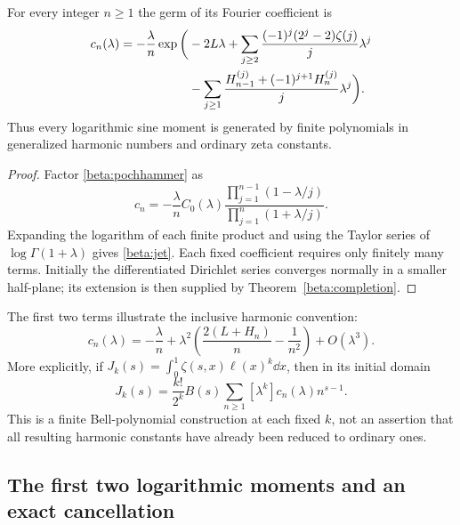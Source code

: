 \begin{proposition}\label{beta:harmonicjets}
For every integer $n\geq1$ the germ of its Fourier coefficient is
\begin{align}\label{beta:jet}
 c_n(\lambda)=-\frac\lambda n\exp\bigg(&-2L\lambda
 +\sum_{j\geq2}\frac{(-1)^j(2^j-2)\zeta(j)}j\lambda^j\notag\\
 &-\sum_{j\geq1}
 \frac{H_{n-1}^{(j)}+(-1)^{j+1}H_n^{(j)}}j\lambda^j\bigg).
\end{align}
Thus every logarithmic sine moment is generated by finite polynomials
in generalized harmonic numbers and ordinary zeta constants.
\end{proposition}
\begin{proof}
Factor \eqref{beta:pochhammer} as
\[
 c_n=-\frac\lambda n C_0(\lambda)
  \frac{\prod_{j=1}^{n-1}(1-\lambda/j)}
       {\prod_{j=1}^{n}(1+\lambda/j)}.
\]
Expanding the logarithm of each finite product and using the Taylor
series of $\log\Gamma(1+\lambda)$ gives \eqref{beta:jet}.
Each fixed coefficient requires only finitely many terms. Initially
the differentiated Dirichlet series converges normally in a smaller
half-plane; its extension is then supplied by
Theorem~\ref{beta:completion}.
\end{proof}

The first two terms illustrate the inclusive harmonic convention:
\begin{equation}\label{beta:firstjets}
 c_n(\lambda)=-\frac\lambda n+\lambda^2
 \left(\frac{2(L+H_n)}n-\frac1{n^2}\right)+O(\lambda^3).
\end{equation}
More explicitly, if $J_k(s)=\int_0^1\zeta(s,x)\ell(x)^k\dd x$,
then in its initial domain
\begin{equation}\label{beta:belltransform}
 J_k(s)=\frac{k!}{2^k}B(s)
 \sum_{n\geq1}[\lambda^k]c_n(\lambda)n^{s-1}.
\end{equation}
This is a finite Bell-polynomial construction at each fixed $k$, not
an assertion that all resulting harmonic constants have already been
reduced to ordinary ones.

\subsection{The first two logarithmic moments and an exact cancellation}

